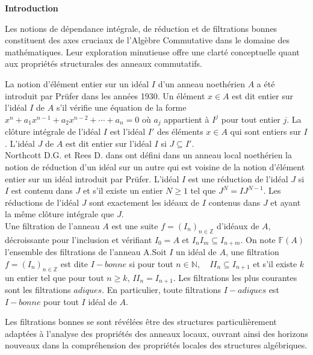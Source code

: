 \newpage
\tableofcontents
\renewcommand{\contentsname}{Table des matières}
\thispagestyle{empty}

\newpage

\setcounter{page}{0} 
\thispagestyle{empty}
\begin{center}
	\LARGE{\textbf{Introduction}}
\end{center}
\vspace{1cm}

Les notions de dépendance intégrale, de réduction et de filtrations bonnes constituent des axes cruciaux de l'Algèbre Commutative dans le domaine des mathématiques. Leur exploration minutieuse offre une clarté conceptuelle quant aux propriétés structurales des anneaux commutatifs.

La notion d'élément entier sur un idéal $I$ d'un anneau noethérien $A$ a été introduit par Prüfer \cite{2} dans les années 1930. Un élément $x \in A $ est dit entier sur l'idéal $I$ de $A$ s'il vérifie une équation de la forme $x^n + a_1 x^{n-1} +a_2 x^{n-2}+ \cdots + a_n = 0$ où $a_j$ appartient à $I^j$ pour tout entier $j$. La clôture intégrale de l'idéal $I$ est l'idéal $I'$ des éléments $x \in A$ qui sont entiers sur $I$. L'idéal $J$ de $A$ est dit entier sur l'idéal $I$ si $J \subseteq I'$.\\ Northcott D.G. et Rees D. dans \cite{4} ont défini dans un anneau local noethérien la notion de réduction d'un idéal sur un autre qui est voisine de la notion d'élément entier sur un idéal introduit par Prüfer. L'idéal $I$ est une réduction de l'idéal $J$ si $I$ est contenu dans $J$ et s'il existe un entier $N \geqslant 1$ tel que $J^N = IJ^{N-1}$. Les réductions de l'idéal $J$ sont exactement les idéaux de $I$ contenus dans $J$ et ayant la même clôture intégrale que $J$.\\
Une filtration de l'anneau $A$ est une suite $f=(I_n)_{n \in \mathbb{Z}}$ d'idéaux de $A$, décroissante pour l'inclusion et vérifiant $I_0 = A$ et $I_n I_m \subseteq I_{n+m}$. On note $\mathbb{F}(A)$ l'ensemble des filtrations de l'anneau A.Soit $I$ un idéal de $A$, une filtration $f=(I_n)_{n \in \mathbb{Z}}$ est dite $I-bonne$ si pour tout $n \in \mathbb{N}, \quad II_n \subseteq I_{n+1}$ et s'il existe $k$ un entier tel que pour tout $n \geqslant k$, $II_n = I_{n+1}$. Les filtrations les plus courantes sont les filtrations $adiques$. En particulier, toute filtrations $I-adiques$ est $I-bonne$ pour tout $I$ idéal de $A$.

Les filtrations bonnes se sont révélées être des structures particulièrement adaptées à l'analyse des propriétés des anneaux locaux, ouvrant ainsi des horizons nouveaux dans la compréhension des propriétés locales des structures algébriques.

